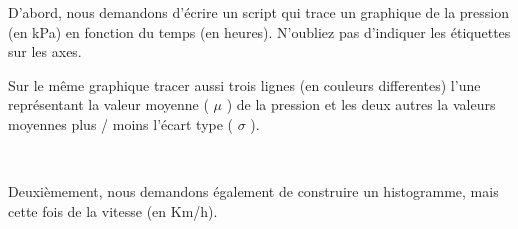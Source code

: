 \documentclass{article}
\begin{document}
    D'abord, nous demandons d'écrire un script qui trace un graphique de la
pression (en kPa) en fonction du temps (en heures). N'oubliez pas
d'indiquer les étiquettes sur les axes.

    Sur le même graphique tracer aussi trois lignes (en couleurs
differentes) l'une représentant la valeur moyenne ( \(\mu\) ) de la
pression et les deux autres la valeurs moyennes plus / moins l'écart
type ( \(\sigma\) ).

    \begin{center}
    \end{center}
    { \hspace*{\fill} \\}
    

    Deuxièmement, nous demandons également de construire un histogramme,
mais cette fois de la vitesse (en Km/h).


    
    
    
    
\end{document}
